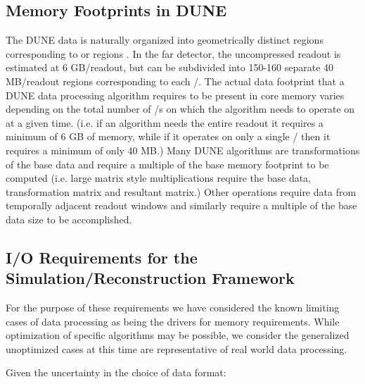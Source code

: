 \documentclass[../main-v1.tex]{subfiles}
\begin{document}
\subsection{Memory Footprints in DUNE}
The DUNE  data is naturally organized into geometrically distinct regions corresponding to  or  regions .  In the far detector, the uncompressed readout is estimated at 6 GB/readout, but can be subdivided into 150-160 separate 40 MB/readout regions corresponding to each /.  The actual data footprint that a DUNE data processing algorithm requires to be present in core memory varies depending on the total number of /s on which the algorithm needs to operate on at a given time.  (i.e. if an algorithm needs the entire readout it requires a minimum of 6 GB of memory, while if it operates on only a single / then it requires a minimum of only 40 MB.)   Many DUNE algorithms are transformations of the base data and require a multiple of the base memory footprint to be computed (i.e. large matrix style multiplications require the base data, transformation matrix and resultant matrix.)  Other operations require data from temporally adjacent readout windows and similarly require a multiple of the base data size to be accomplished.

\subsection{I/O Requirements for the Simulation/Reconstruction Framework}

For the purpose of these requirements we have considered the known limiting cases of data processing as being the drivers for memory requirements.  While optimization of specific algorithms may be possible, we consider the generalized unoptimized cases at this time are representative of real world data processing.

Given the uncertainty in the choice of data format:
\end{document}
